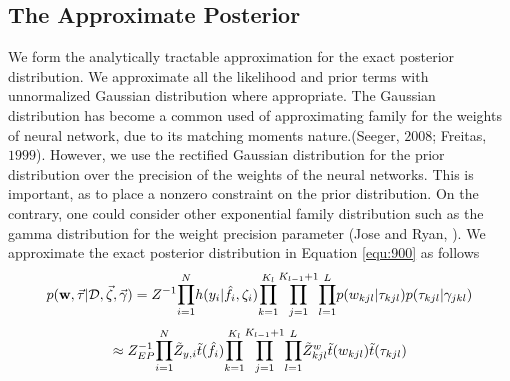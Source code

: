 \documentclass[]{article}
\begin{document}
\subsection{The Approximate Posterior}\label{sec:3.1}
We form the analytically tractable approximation for the exact posterior distribution. We approximate all the likelihood and prior terms with unnormalized Gaussian distribution where appropriate. The Gaussian distribution has become a common used of approximating family for the weights of neural network, due to its matching moments nature.(Seeger, $2008$; Freitas, $1999$). However, we use the rectified Gaussian distribution for the prior distribution over the precision of the weights of the neural networks. This is important, as to place a nonzero constraint on the prior distribution. On the contrary, one could consider other exponential family distribution such as the gamma distribution for the weight precision parameter (Jose and Ryan, \cite{jose2015propagation}). We approximate the exact posterior distribution in Equation \ref{equ:900} as follows
\begin{equation}
	p(\mathbf{w}, \vec{\tau}|\mathcal{D},\vec{\zeta},\vec{\gamma}) = Z^{-1}\mathlarger \prod_{i=1}^N h(y_i|\hat{f}_i,\zeta_i)\mathlarger \prod_{k=1}^{K_l}\mathlarger \prod_{j=1}^{K_{l-1}+1}\mathlarger \prod_{l=1}^{L} p(w_{kjl}|\tau_{kjl}) p(\tau_{kjl}|\gamma_{jkl})
	\label{equ:21}
\end{equation} 
\begin{equation}
	\approx Z_{EP}^{-1}\mathlarger \prod_{i=1}^N \tilde{Z}_{y,i} \tilde{t}(\hat{f}_i)\mathlarger \prod_{k=1}^{K_l}\mathlarger \prod_{j=1}^{K_{l-1}+1}\mathlarger \prod_{l=1}^{L} \tilde{Z}_{kjl}^w\tilde{t}(w_{kjl})\tilde{t}(\tau_{kjl})
	\label{equ:22}
\end{equation} 
\end{document}
